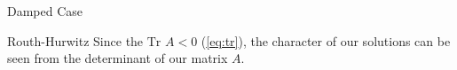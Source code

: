 \documentclass{beamer}
\begin{document}
\begin{frame}[allowframebreaks]{Damped Case}
\begin{block}{Routh-Hurwitz}
  Since the $\text{Tr }A<0$ (\autoref{eq:tr}), the character of our solutions can be seen from the determinant of our matrix $A$.
\end{block}
\end{frame}
\end{document}
